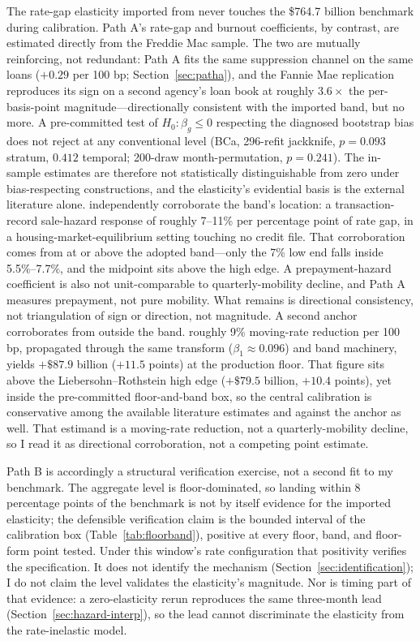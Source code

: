 The rate-gap elasticity imported from \citet{liebersohn2024} never touches the \$764.7 billion benchmark during calibration. Path A's rate-gap and burnout coefficients, by contrast, are estimated directly from the Freddie Mac sample. The two are mutually reinforcing, not redundant: Path A fits the same suppression channel on the same loans ($+0.29$ per 100 bp; Section~\ref{sec:patha}), and the Fannie Mae replication reproduces its sign on a second agency's loan book at roughly $3.6\times$ the per-basis-point magnitude---directionally consistent with the imported band, but no more. A pre-committed test of $H_0\!: \beta_g \le 0$ respecting the diagnosed bootstrap bias does not reject at any conventional level (BCa, 296-refit jackknife, $p = 0.093$ stratum, $0.412$ temporal; 200-draw month-permutation, $p = 0.241$). The in-sample estimates are therefore not statistically distinguishable from zero under bias-respecting constructions, and the elasticity's evidential basis is the external literature alone. \citet{graybill2026} independently corroborate the band's location: a transaction-record sale-hazard response of roughly 7--11\% per percentage point of rate gap, in a housing-market-equilibrium setting touching no credit file. That corroboration comes from at or above the adopted band---only the 7\% low end falls inside 5.5\%--7.7\%, and the midpoint sits above the high edge. A prepayment-hazard coefficient is also not unit-comparable to  quarterly-mobility decline, and Path A measures prepayment, not pure mobility. What remains is directional consistency, not triangulation of sign or direction, not magnitude. A second anchor corroborates from outside the band.  roughly 9\% moving-rate reduction per 100 bp, propagated through the same transform ($\beta_1 \approx 0.096$) and band machinery, yields $+\$87.9$ billion ($+11.5$ points) at the production floor. That figure sits above the Liebersohn--Rothstein high edge ($+\$79.5$ billion, $+10.4$ points), yet inside the pre-committed floor-and-band box, so the central calibration is conservative among the available literature estimates and against the \citet{graybill2026} anchor as well. That estimand is a moving-rate reduction, not a quarterly-mobility decline, so I read it as directional corroboration, not a competing point estimate.

Path B is accordingly a structural verification exercise, not a second fit to my benchmark. The aggregate level is floor-dominated, so landing within 8 percentage points of the benchmark is not by itself evidence for the imported elasticity; the defensible verification claim is the bounded interval of the calibration box (Table~\ref{tab:floorband}), positive at every floor, band, and floor-form point tested. Under this window's rate configuration that positivity verifies the specification. It does not identify the mechanism (Section~\ref{sec:identification}); I do not claim the level validates the elasticity's magnitude. Nor is timing part of that evidence: a zero-elasticity rerun reproduces the same three-month lead (Section~\ref{sec:hazard-interp}), so the lead cannot discriminate the elasticity from the rate-inelastic model.


